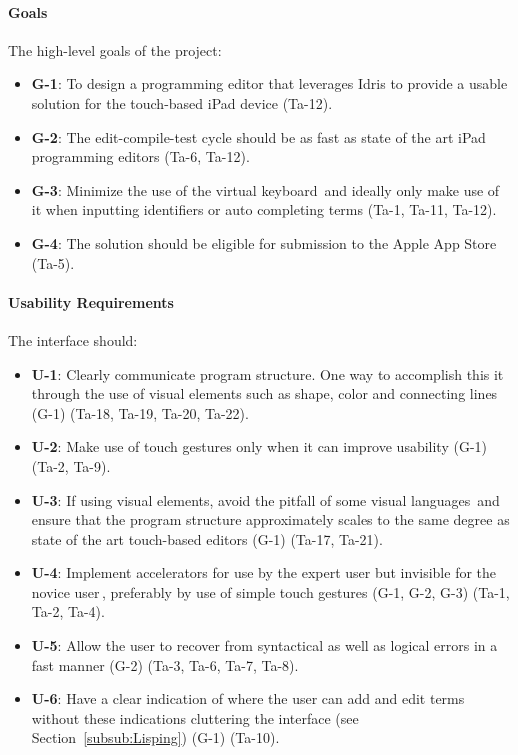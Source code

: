 
\paragraph{Goals}
The high-level goals of the project:

\begin{itemize} 
	\item \textbf{G-1}: To design a programming editor that leverages Idris to provide a usable solution for the touch-based iPad device
	(Ta-12).
	\item \textbf{G-2}: The edit-compile-test cycle should be as fast as state of the art iPad programming editors
	(Ta-6, Ta-12).
	\item \textbf{G-3}: Minimize the use of the virtual keyboard\,\cite[pp. 76]{nielsen2013mobile} and ideally only make use of it when inputting identifiers or auto completing terms
	(Ta-1, Ta-11, Ta-12).
	\item \textbf{G-4}: The solution should be eligible for submission to the Apple App Store (Ta-5). 
\end{itemize}

\paragraph{Usability Requirements}

The interface should:
\begin{itemize}     
	\item \textbf{U-1}: Clearly communicate program structure. One way to accomplish this it through the use of visual elements such as shape, color and connecting lines (G-1)
	(Ta-18, Ta-19, Ta-20, Ta-22).
	\item \textbf{U-2}: Make use of touch gestures only when it can improve usability (G-1)
	(Ta-2, Ta-9).
	\item \textbf{U-3}: If using visual elements, avoid the pitfall of some visual languages\,\cite{green1992visual} and ensure that the program structure approximately scales to the same degree as state of the art touch-based editors (G-1)
	(Ta-17, Ta-21).
	\item \textbf{U-4}: Implement accelerators for use by the expert user but invisible for the novice user\,\cite{nielsen1990heuristic}, preferably by use of simple touch gestures (G-1, G-2, G-3)
	(Ta-1, Ta-2, Ta-4).
	\item \textbf{U-5}: Allow the user to recover from syntactical as well as logical errors in a fast manner (G-2)
	(Ta-3, Ta-6, Ta-7, Ta-8).
	\item \textbf{U-6}: Have a clear indication of where the user can add and edit terms without these indications cluttering the interface (see Section~\ref{subsub:Lisping}) (G-1)
	(Ta-10).
\end{itemize}

